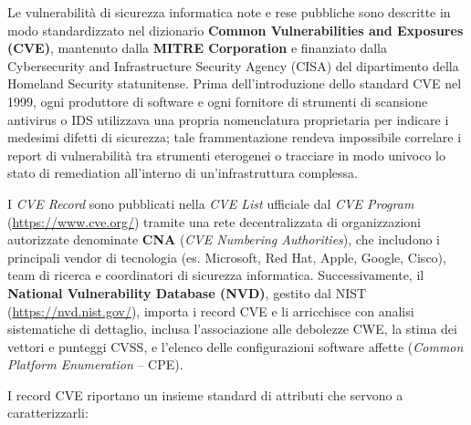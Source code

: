 \documentclass[../../main.tex]{subfiles}
\begin{document}
Le vulnerabilità di sicurezza informatica note e rese pubbliche sono descritte in modo standardizzato nel dizionario \textbf{Common Vulnerabilities and Exposures (CVE)}, mantenuto dalla \textbf{MITRE Corporation} e finanziato dalla Cybersecurity and Infrastructure Security Agency (CISA) del dipartimento della Homeland Security statunitense. Prima dell'introduzione dello standard CVE nel 1999, ogni produttore di software e ogni fornitore di strumenti di scansione antivirus o IDS utilizzava una propria nomenclatura proprietaria per indicare i medesimi difetti di sicurezza; tale frammentazione rendeva impossibile correlare i report di vulnerabilità tra strumenti eterogenei o tracciare in modo univoco lo stato di remediation all'interno di un'infrastruttura complessa.

I \textit{CVE Record} sono pubblicati nella \textit{CVE List} ufficiale dal \textit{CVE Program} (\url{https://www.cve.org/}) tramite una rete decentralizzata di organizzazioni autorizzate denominate \textbf{CNA} (\textit{CVE Numbering Authorities}), che includono i principali vendor di tecnologia (es. Microsoft, Red Hat, Apple, Google, Cisco), team di ricerca e coordinatori di sicurezza informatica. Successivamente, il \textbf{National Vulnerability Database (NVD)}, gestito dal NIST (\url{https://nvd.nist.gov/}), importa i record CVE e li arricchisce con analisi sistematiche di dettaglio, inclusa l'associazione alle debolezze CWE, la stima dei vettori e punteggi CVSS, e l'elenco delle configurazioni software affette (\textit{Common Platform Enumeration} -- CPE).

I record CVE riportano un insieme standard di attributi che servono a caratterizzarli:
\end{document}
